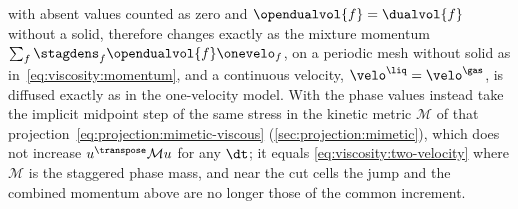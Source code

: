 with absent values counted as zero and $\opendualvol{f}=\dualvol{f}$ without
a solid, therefore changes exactly as the mixture momentum
$\sum_f\stagdens_f\opendualvol{f}\onevelo_f$, on a periodic mesh without
solid as in~\cref{eq:viscosity:momentum}, and a continuous velocity,
$\velo^{\liq}=\velo^{\gas}$, is diffused exactly as in the one-velocity
model. With  the phase values instead take the
implicit midpoint step of the same stress in the kinetic metric $\mathcal M$
of that projection~\cref{eq:projection:mimetic-viscous}
(\cref{sec:projection:mimetic}), which does not increase
$u^{\transpose}\mathcal Mu$ for any $\dt$; it equals
\cref{eq:viscosity:two-velocity} where $\mathcal M$ is the staggered phase
mass, and near the cut cells the jump and the combined momentum above are no
longer those of the common increment.

